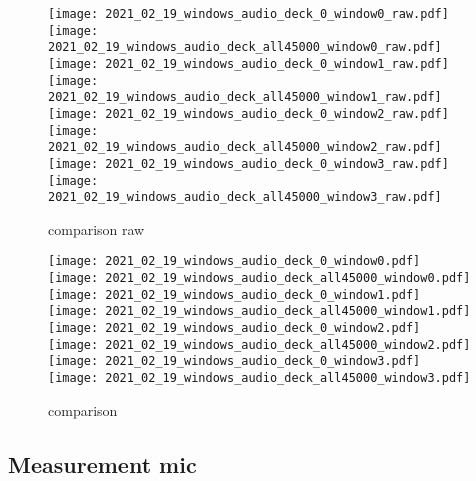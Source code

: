 \begin{figure}[h]
  \centering
  \begin{minipage}{\textwidth}
  \centering
  \texttt{[image: 2021\_02\_19\_windows\_audio\_deck\_0\_window0\_raw.pdf]}
  \texttt{[image: 2021\_02\_19\_windows\_audio\_deck\_all45000\_window0\_raw.pdf]}
  \texttt{[image: 2021\_02\_19\_windows\_audio\_deck\_0\_window1\_raw.pdf]}
  \texttt{[image: 2021\_02\_19\_windows\_audio\_deck\_all45000\_window1\_raw.pdf]}
  \texttt{[image: 2021\_02\_19\_windows\_audio\_deck\_0\_window2\_raw.pdf]}
  \texttt{[image: 2021\_02\_19\_windows\_audio\_deck\_all45000\_window2\_raw.pdf]}
  \texttt{[image: 2021\_02\_19\_windows\_audio\_deck\_0\_window3\_raw.pdf]}
  \texttt{[image: 2021\_02\_19\_windows\_audio\_deck\_all45000\_window3\_raw.pdf]}
  \end{minipage}
  \caption{comparison raw}
  \label{fig:audio_deck-comparison-raw}
\end{figure}
\begin{figure}[h]
  \centering
  \begin{minipage}{\textwidth}
  \centering
  \texttt{[image: 2021\_02\_19\_windows\_audio\_deck\_0\_window0.pdf]}
  \texttt{[image: 2021\_02\_19\_windows\_audio\_deck\_all45000\_window0.pdf]} \\
  \texttt{[image: 2021\_02\_19\_windows\_audio\_deck\_0\_window1.pdf]}
  \texttt{[image: 2021\_02\_19\_windows\_audio\_deck\_all45000\_window1.pdf]} \\
  \texttt{[image: 2021\_02\_19\_windows\_audio\_deck\_0\_window2.pdf]}
  \texttt{[image: 2021\_02\_19\_windows\_audio\_deck\_all45000\_window2.pdf]} \\
  \texttt{[image: 2021\_02\_19\_windows\_audio\_deck\_0\_window3.pdf]}
  \texttt{[image: 2021\_02\_19\_windows\_audio\_deck\_all45000\_window3.pdf]} 
  \end{minipage}
  \caption{comparison}
  \label{fig:audio_deck-comparison}
\end{figure}

\FloatBarrier
\subsection{Measurement mic}

